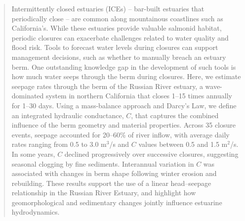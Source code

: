 \documentclass[preprint,12pt,authoryear]{elsarticle}
\begin{document}
\begin{frontmatter}
\begin{abstract}

 
 Intermittently closed estuaries (ICEs) -- bar-built estuaries that periodically close --  are common along mountainous coastlines such as California's. While these estuaries provide valuable salmonid habitat, periodic closures can exacerbate challenges related to water quality and flood risk. Tools to forecast water levels during closures can support management decisions, such as whether to manually breach an estuary berm. One outstanding knowledge gap in the development of such tools is how much water seeps through the berm during closures.
Here, we estimate seepage rates through the berm of the Russian River estuary, a wave-dominated system in northern California that closes 1–15 times annually for 1–30 days. Using a mass-balance approach and Darcy’s Law, we define an integrated hydraulic conductance, $C$, that captures the combined influence of the berm geometry and material properties. Across 35 closure events, seepage accounted for 20–60\% of river inflow, with average daily rates ranging from 0.5 to 3.0 m$^3$/s and $C$ values between 0.5 and 1.5 m$^2$/s. In some years, $C$ declined progressively over successive closures, suggesting seasonal clogging by fine sediments. Interannual variation in $C$ was associated with changes in berm shape following winter erosion and rebuilding. These results support the use of a linear head–seepage relationship in the Russian River Estuary, and highlight how geomorphological and sedimentary changes jointly influence estuarine hydrodynamics.


\end{abstract}



\end{frontmatter}
\end{document}

